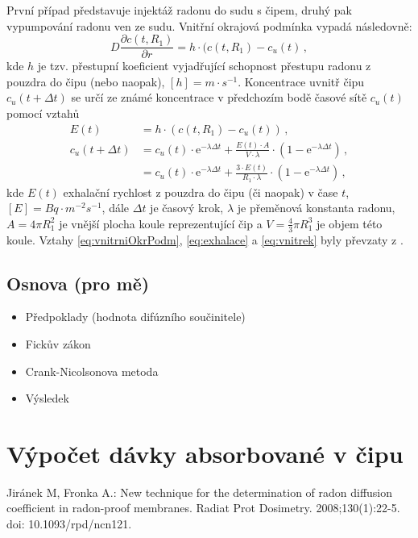 \documentclass[11pt,a4paper]{article}
\begin{document}
První případ představuje injektáž radonu do sudu s čipem, druhý pak vypumpování radonu ven ze sudu. Vnitřní okrajová podmínka vypadá následovně:
\begin{equation}
	D\frac{\partial c(t,R_1)}{\partial r}=h\cdot(c(t,R_1)-c_u(t)\,,\label{eq:vnitrniOkrPodm}
\end{equation}
kde $h$ je tzv. přestupní koeficient vyjadřující schopnost přestupu radonu z pouzdra do čipu (nebo naopak), $[h]=\si{m\cdot s^{-1}}$. Koncentrace uvnitř čipu $c_u(t+\Delta t)$ se určí ze známé koncentrace v předchozím bodě časové sítě $c_u(t)$ pomocí vztahů
\begin{align}
	E(t)&=h\cdot(c(t,R_1)-c_u(t))\,,\label{eq:exhalace}\\
	c_u(t+\Delta t)&=c_u(t)\cdot \mathrm{e}^{-\lambda\Delta t}+\frac{E(t)\cdot A}{V\cdot \lambda}\cdot \left(1-\mathrm{e}^{-\lambda\Delta t}\right)\,,\nonumber\\
	&=c_u(t)\cdot \mathrm{e}^{-\lambda\Delta t}+\frac{3\cdot E(t)}{R_1\cdot \lambda}\cdot \left(1-\mathrm{e}^{-\lambda\Delta t}\right)\,,\label{eq:vnitrek}
\end{align}
kde $E(t)$ exhalační rychlost z pouzdra do čipu (či naopak) v čase $t$, $[E]=\si{Bq\cdot m^{-2}s^{-1}}$, dále $\Delta t$ je časový krok, $\lambda$ je přeměnová konstanta radonu, $A=4\pi R_1^2$ je vnější plocha koule reprezentující čip a $V=\frac{4}{3}\pi R_1^3$ je objem této koule. Vztahy \eqref{eq:vnitrniOkrPodm}, \eqref{eq:exhalace} a \eqref{eq:vnitrek} byly převzaty z \cite{jiranek1}.
\subsection{Osnova (pro mě)}
\begin{itemize}
	\item Předpoklady (hodnota difúzního součinitele)
	\item Fickův zákon
	\item Crank-Nicolsonova metoda
	\item Výsledek
\end{itemize}
\section{Výpočet dávky absorbované v čipu}

\begin{thebibliography}{Mm99}

 Jiránek M, Fronka A.: New technique for the determination of radon diffusion coefficient in radon-proof membranes. Radiat Prot Dosimetry. 2008;130(1):22-5. doi: 10.1093/rpd/ncn121.
\end{thebibliography}
\end{document}

